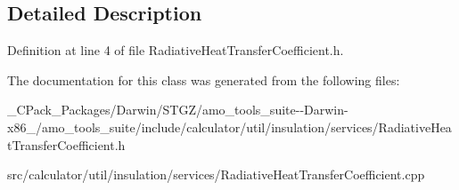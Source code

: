 \subsection{Detailed Description}


Definition at line 4 of file Radiative\+Heat\+Transfer\+Coefficient.\+h.



The documentation for this class was generated from the following files\+:\begin{DoxyCompactItemize}
\item 
\+\_\+\+C\+Pack\+\_\+\+Packages/\+Darwin/\+S\+T\+G\+Z/amo\+\_\+tools\+\_\+suite-\/-\/\+Darwin-\/x86\+\_/amo\+\_\+tools\+\_\+suite/include/calculator/util/insulation/services/Radiative\+Heat\+Transfer\+Coefficient.\+h\item 
src/calculator/util/insulation/services/Radiative\+Heat\+Transfer\+Coefficient.\+cpp\end{DoxyCompactItemize}
